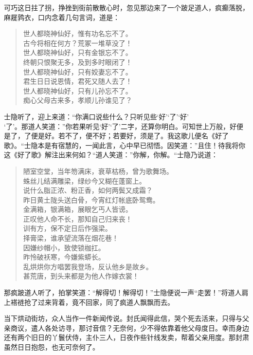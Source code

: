 \documentclass[12pt,oneside]{book}
\newenvironment{shici}{%
\begin{verse}%
\centering\large\hspace{12pt}}%
{\end{verse}}
\begin{document}
可巧这日拄了拐，挣挫到街前散散心时，忽见那边来了一个跛足道人，疯癫落脱，麻屣鹑衣，口内念着几句言词，道是：

\begin{shici}
世人都晓神仙好，惟有功名忘不了。\\
古今将相在何方？荒冢一堆草没了！\\
世人都晓神仙好，只有金银忘不了。\\
终朝只恨聚无多，及到多时眼闭了！\\
世人都晓神仙好，只有姣妻忘不了。\\
君生日日说恩情，君死又随人去了！\\
世人都晓神仙好，只有儿孙忘不了。\\
痴心父母古来多，孝顺儿孙谁见了？
\end{shici}


士隐听了，迎上来道：“你满口说些什么？只听见些‘好’‘了’‘好’\\‘了’。那道人笑道：”你若果听见‘好’‘了’二字，还算你明白。可知世上万般，好便是了，了便是好。若不了，便不好；若要好，须是了。我这歌儿便名《好了歌》。“士隐本是有宿慧的，一闻此言，心中早已彻悟。因笑道：”且住！待我将你这《好了歌》解注出来何如？“道人笑道：”你解，你解。“士隐乃说道：

\begin{shici}
陋室空堂，当年笏满床，衰草枯杨，曾为歌舞场。\\
蛛丝儿结满雕梁，绿纱今又糊在蓬窗上。\\
说什么脂正浓、粉正香，如何两鬓又成霜？\\
昨日黄土陇头送白骨，今宵红灯帐底卧鸳鸯。\\
金满箱，银满箱，展眼乞丐人皆谤。\\
正叹他人命不长，那知自己归来丧！\\
训有方，保不定日后作强梁。\\
择膏梁，谁承望流落在烟花巷！\\
因嫌纱帽小，致使锁枷扛。\\
昨怜破袄寒，今嫌紫蟒长。\\
乱烘烘你方唱罢我登场，反认他乡是故乡。\\
甚荒唐，到头来都是为他人作嫁衣裳！
\end{shici}


那疯跛道人听了，拍掌笑道：“解得切！解得切！”士隐便说一声“走罢！”将道人肩上褡裢抢了过来背着，竟不回家，同了疯道人飘飘而去。

当下烘动街坊，众人当作一件新闻传说。封氏闻得此信，哭个死去活来，只得与父亲商议，遣人各处访寻，那讨音信？无奈何，少不得依靠着他父母度日。幸而身边还有两个旧日的丫鬟伏侍，主仆三人，日夜作些针线发卖，帮着父亲用度。那封肃虽然日日抱怨，也无可奈何了。
\end{document}
